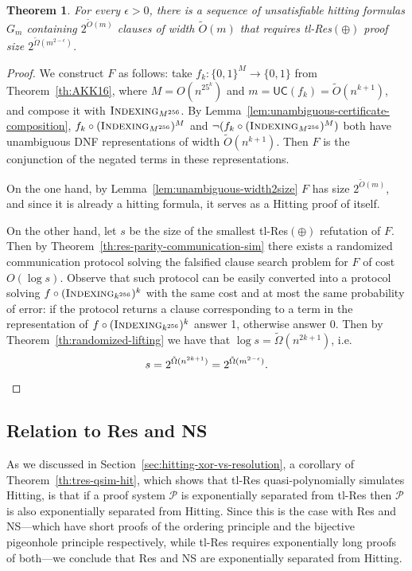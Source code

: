\documentclass[11pt]{article}
\newcommand{\scterm}[1]{{\textrm{\sc #1}}}
\newcommand{\hit}{\scterm{Hitting}}
\newcommand{\tres}{\scterm{tl-Res}}
\newcommand{\res}{\scterm{Res}}
\newcommand{\tresp}{{\tres}$(\oplus)$}
\newcommand{\ns}{\scterm{NS}}
\newcommand{\indexing}{\scterm{Indexing}}
\newcommand{\ucert}{\mathsf{UC}}
\numberwithin{equation}{section}
\newtheorem{theorem}{Theorem}[section]
\begin{document}
\begin{theorem}
  \label{th:hitting-vs-treeresxor}
  For every $\epsilon>0$, there is a sequence of unsatisfiable hitting formulas $G_m$ containing $2^{\tilde O(m)}$ clauses of width $\tilde O(m)$ that requires {\tres}$(\oplus)$ proof size $2^{\tilde\Omega(m^{2-\epsilon})}$.
\end{theorem}
\begin{proof}
  We construct $F$ as follows: take $f_k\colon \{0,1\}^M \to \{0,1\}$ from Theorem~\ref{th:AKK16}, where $M=O(n^{25^k})$ and $m=\ucert(f_k)=\tilde O(n^{k+1})$, and compose it with $\indexing_{M^{256}}$. By Lemma~\ref{lem:unambiguous-certificate-composition}, $f_k \circ (\indexing_{M^{256}})^M$ and $\lnot (f_k \circ (\indexing_{M^{256}})^M)$ both have unambiguous DNF representations of width $\tilde{O}(n^{k+1})$. Then $F$ is the conjunction of the negated terms in these representations.

  On the one hand, by Lemma~\ref{lem:unambiguous-width2size} $F$ has size $2^{\tilde{O}(m)}$, and since it is already a hitting formula, it serves as a {\hit} proof of itself.

  On the other hand, let $s$ be the size of the smallest {\tresp} refutation of $F$. Then by Theorem~\ref{th:res-parity-communication-sim} there exists a randomized communication protocol solving the falsified clause search problem for $F$ of cost $O(\log s)$. Observe that such protocol can be easily converted into a protocol solving $f \circ (\indexing_{k^{256}})^k$ with the same cost and at most the same probability of error: if the protocol returns a clause corresponding to a term in the representation of $f \circ (\indexing_{k^{256}})^k$ answer 1, otherwise answer $0$. Then by Theorem~\ref{th:randomized-lifting} we have that $\log s = \tilde{\Omega}(n^{2k+1})$, i.e.
  \[s = 2^{\tilde{\Omega}(n^{2k+1})} = 2^{\tilde{\Omega}(m^{2-\epsilon})}. \qedhere\]
\end{proof}


\subsection{Relation to {\res} and {\ns}}
\label{sec:hitting-vs-res-ns}

As we discussed in Section~\ref{sec:hitting-xor-vs-resolution}, a corollary of Theorem~\ref{th:tres-qsim-hit}, which shows that {\tres} quasi-polynomially simulates {\hit}, is that if a proof system $\mathcal{P}$ is exponentially separated from {\tres} then $\mathcal{P}$ is also exponentially separated from {\hit}. Since this is the case with {\res} and {\ns}---which have short proofs of the ordering principle and the bijective pigeonhole principle \cite{BR96} respectively, while {\tres} requires exponentially long proofs of both---we conclude that {\res} and {\ns} are exponentially separated from {\hit}.
\end{document}
